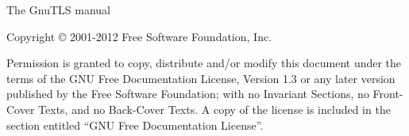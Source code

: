 \thispagestyle{empty}

\begin{center}
\huge{The GnuTLS manual}
\end{center}



\newpage

\thispagestyle{empty}


\begin{flushleft}
Copyright \copyright{} 2001-2012 Free Software Foundation, Inc.
\end{flushleft}

\begin{flushleft}
Permission is granted to copy, distribute and/or modify this document
under the terms of the GNU Free Documentation License, Version 1.3 or
any later version published by the Free Software Foundation; with no
Invariant Sections, no Front-Cover Texts, and no Back-Cover Texts.  A
copy of the license is included in the section entitled ``GNU Free
Documentation License''.
\end{flushleft}

